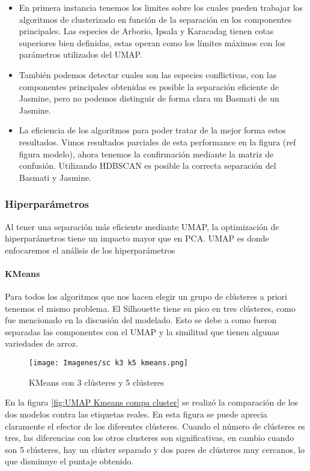 \documentclass{article}
\begin{document}
\begin{itemize}
  \item En primera instancia tenemos los limites sobre los cuales pueden trabajar los algoritmos de clusterizado en función de la separación en los componentes principales. Las especies de Arborio, Ipsala y Karacadag tienen cotas superiores bien definidas, estas operan como los límites máximos con los parámetros utilizados del UMAP.
  \item También podemos detectar cuales son las especies conflictivas, con las componentes principales obtenidas es posible la separación eficiente de Jasmine, pero no podemos distinguir de forma clara un Basmati de un Jasmine.
  \item La eficiencia de los algoritmos para poder tratar de la mejor forma estos resultados. Vimos resultados parciales de esta performance en la figura (ref figura modelo), ahora tenemos la confirmación mediante la matriz de confusión. Utilizando HDBSCAN es posible la correcta separación del Basmati y Jasmine.
\end{itemize}

\subsubsection{Hiperparámetros}
Al tener una separación más eficiente mediante UMAP, la optimización de hiperparámetros tiene un impacto mayor que en PCA. UMAP es donde enfocaremos el análisis de los hiperparámetros

\paragraph{KMeans}

Para todos los algoritmos que nos hacen elegir un grupo de clústeres a priori tenemos el mismo problema. El Silhouette tiene su pico en tres clústeres, como fue mencionado en la discusión del modelado. Esto se debe a como fueron separadas las componentes con el UMAP y la similitud que tienen algunas variedades de arroz.

\begin{figure}[!htb]
    \centering
    \texttt{[image: Imagenes/sc k3 k5 kmeans.png]}
    \caption{KMeans con 3 clústeres y 5 clústeres}
    \label{fig:UMAP Kmeans clus}
\end{figure}

En la figura \ref{fig:UMAP Kmeans compa cluster} se realizó la comparación de los dos modelos contra las etiquetas reales. En esta figura se puede aprecia claramente el efector de los diferentes clústeres. Cuando el número de clústeres es tres, las diferencias con los otros clusteres son significativas, en cambio cuando son 5 clústeres, hay un clúster separado y dos pares de clústeres muy cercanos, lo que disminuye el puntaje obtenido.
\end{document}
